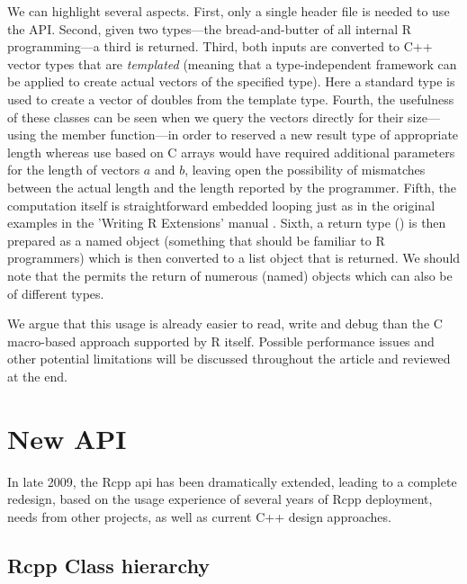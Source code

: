 We can highlight several aspects. First, only a single header file
 is needed to use the  API.  Second, given two
 types---the bread-and-butter of all internal R programming---a
third is returned.  Third, both inputs are converted to C++ vector types that
are \textsl{templated} (meaning that a type-independent framework can be
applied to create actual vectors of the specified type). Here a standard 
type is used to create a vector of doubles from the template type.
Fourth, the usefulness of these classes can be seen when we query the
vectors directly for their size---using the  member function---in
order to reserved a new result type of appropriate length whereas use based
on C arrays would have required additional parameters for the length of
vectors $a$ and $b$, leaving open the possibility of mismatches between the
actual length and the length reported by the programmer.  Fifth, the
computation itself is straightforward embedded looping just as in the
original examples in the 'Writing R Extensions' manual \citep{R:exts}.
Sixth, a return type () is then prepared as a named
object (something that should be familiar to R programmers) which is then
converted to a list object that is returned.  We should note that the
 permits the return of numerous (named) objects which can
also be of different types.

We argue that this usage is already easier to read, write and debug than the
C macro-based approach supported by R itself. Possible performance issues and
other potential limitations will be discussed throughout the article and
reviewed at the end.

\section{New  API}
\label{sec:new_rcpp}

In late 2009, the Rcpp api has been dramatically extended, leading to a 
complete redesign, based on the usage experience of several 
years of Rcpp deployment, needs from other projects, 
as well as current C++ design approaches.

\subsection{Rcpp Class hierarchy}

